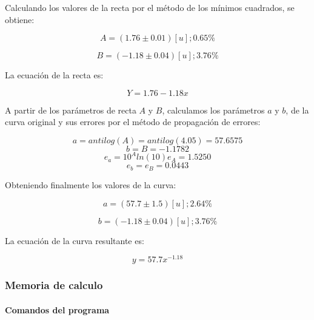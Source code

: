\documentclass[letter,11pt]{article}
\begin{document}
Calculando los valores de la recta por el método de los mínimos cuadrados, se
obtiene:

\begin{equation}
    A = (1.76 \pm 0.01)[u];0.65\%
\end{equation}

\begin{equation}
    B = (-1.18 \pm 0.04)[u];3.76\%
\end{equation}

La ecuación de la recta es:

\begin{equation}
    Y = 1.76 - 1.18 x
\end{equation}

A partir de los parámetros de recta $A$ y $B$, calculamos los parámetros $a$ y
$b$, de la curva original y sus errores por el método de propagación de errores:

\begin{equation*}
    a = antilog(A) = antilog(4.05) = 57.6575
\end{equation*}
\begin{equation*}
    b = B = -1.1782
\end{equation*}
\begin{equation*}
    e_a = 10^A ln(10) e_A = 1.5250
\end{equation*}
\begin{equation*}
    e_b = e_B = 0.0443
\end{equation*}

Obteniendo finalmente los valores de la curva:

\begin{equation}
    a = (57.7 \pm 1.5)[u];2.64\%
\end{equation}

\begin{equation}
    b = (-1.18 \pm 0.04)[u];3.76\%
\end{equation}

La ecuación de la curva resultante es:

\begin{equation}
    y = 57.7 x^{-1.18}
\end{equation}

\subsubsection{Memoria de calculo}

\paragraph{Comandos del programa}
\begin{alltt}
\footnotesize

\normalsize
\end{alltt}
\end{document}

